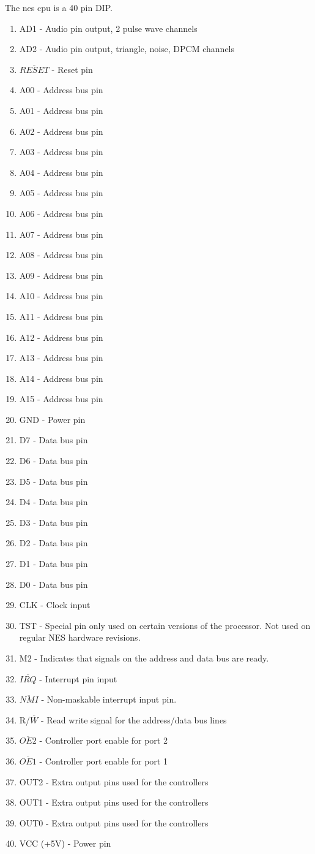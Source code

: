 \documentclass[letterpaper,12pt,twoside]{book}
\begin{document}
The nes cpu is a 40 pin DIP.
\begin {enumerate}
\item AD1 - Audio pin output, 2 pulse wave channels
\item AD2 - Audio pin output, triangle, noise, DPCM channels
\item $\overline{RESET}$ - Reset pin
\item A00 - Address bus pin
\item A01 - Address bus pin
\item A02 - Address bus pin
\item A03 - Address bus pin
\item A04 - Address bus pin
\item A05 - Address bus pin
\item A06 - Address bus pin
\item A07 - Address bus pin
\item A08 - Address bus pin
\item A09 - Address bus pin
\item A10 - Address bus pin
\item A11 - Address bus pin
\item A12 - Address bus pin
\item A13 - Address bus pin
\item A14 - Address bus pin
\item A15 - Address bus pin
\item GND - Power pin
\item D7 - Data bus pin
\item D6 - Data bus pin
\item D5 - Data bus pin
\item D4 - Data bus pin
\item D3 - Data bus pin
\item D2 - Data bus pin
\item D1 - Data bus pin
\item D0 - Data bus pin
\item CLK - Clock input
\item TST - Special pin only used on certain versions of the processor. Not used on regular NES hardware revisions.
\item M2 - Indicates that signals on the address and data bus are ready.
\item $\overline{IRQ}$ - Interrupt pin input
\item $\overline{NMI}$ - Non-maskable interrupt input pin.
\item R/$\overline{W}$ - Read write signal for the address/data bus lines
\item $\overline{OE2}$ - Controller port enable for port 2
\item $\overline{OE1}$ - Controller port enable for port 1
\item OUT2 - Extra output pins used for the controllers
\item OUT1 - Extra output pins used for the controllers
\item OUT0 - Extra output pins used for the controllers
\item VCC (+5V) - Power pin
\end{enumerate}
\end{document}
